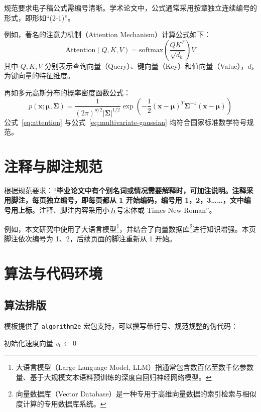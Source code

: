 规范要求电子稿公式需编号清晰。学术论文中，公式通常采用按章独立连续编号的形式，即形如“(2-1)”。

例如，著名的注意力机制（Attention Mechanism）\cite{Transformer}计算公式如下：
\begin{equation}
\label{eq:attention}
\mathrm{Attention}(Q, K, V) = \mathrm{softmax}\left(\frac{QK^T}{\sqrt{d_k}}\right)V
\end{equation}
其中 $Q, K, V$ 分别表示查询向量（Query）、键向量（Key）和值向量（Value），$d_k$ 为键向量的特征维度。

再如多元高斯分布的概率密度函数公式：
\begin{equation}
\label{eq:multivariate-gaussian}
p(\mathbf{x}; \boldsymbol{\mu}, \boldsymbol{\Sigma}) = \frac{1}{(2\pi)^{d/2}|\boldsymbol{\Sigma}|^{1/2}} \exp\left(-\frac{1}{2}(\mathbf{x}-\boldsymbol{\mu})^T \boldsymbol{\Sigma}^{-1} (\mathbf{x}-\boldsymbol{\mu})\right)
\end{equation}
公式~\eqref{eq:attention} 与公式~\eqref{eq:multivariate-gaussian} 均符合国家标准数学符号规范。

\section{注释与脚注规范}

根据规范要求：“\textbf{毕业论文中有个别名词或情况需要解释时，可加注说明。注释采用脚注，每页独立编号，即每页都从 1 开始编码，编号用 1，2，3……，文中编号用上标}。注释、脚注内容采用小五号宋体或 Times New Roman”。

例如，本文研究中使用了大语言模型\footnote{大语言模型（Large Language Model, LLM）指通常包含数百亿至数千亿参数量、基于大规模文本语料预训练的深度自回归神经网络模型。}，并结合了向量数据库\footnote{向量数据库（Vector Database）是一种专用于高维向量数据的索引检索与相似度计算的专用数据库系统。}进行知识增强。本页脚注依次编号为 1、2，后续页面的脚注重新从 1 开始。

\section{算法与代码环境}

\subsection{算法排版}
模板提供了 \texttt{algorithm2e} 宏包支持，可以撰写带行号、规范规整的伪代码：

\begin{algorithm}[H]
\caption{基于动量的随机梯度下降算法 (SGD with Momentum)}
\label{alg:momentum-sgd}
\KwIn{学习率 $\eta$，动量衰减系数 $\gamma \in [0, 1)$，初始模型参数 $\theta_0$}
初始化速度向量 $v_0 \leftarrow 0$\;
\;
\end{algorithm}

